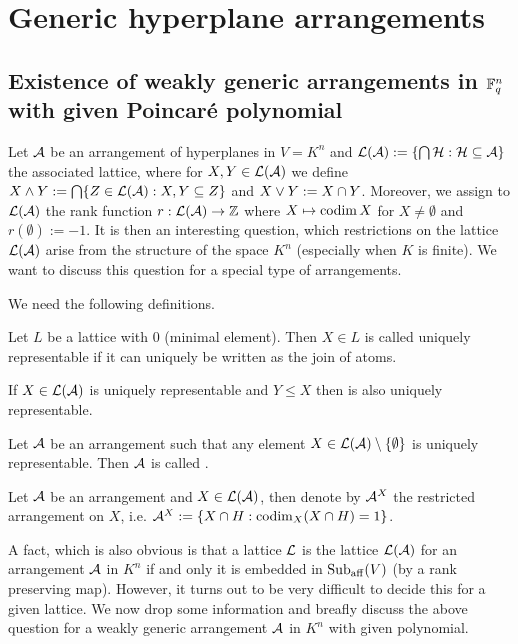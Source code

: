 \section{Generic hyperplane arrangements}

\subsection{Existence of weakly generic arrangements in $\mathbb{F}_{q}^n$ with given Poincaré polynomial}

Let $\mathcal{A}$ be an arrangement of hyperplanes in $V=K^n$ and $\mathcal{L}(\mathcal{A}):=\{\bigcap \mathcal{H}:\mathcal{H}\subseteq \mathcal{A}\}$ the associated lattice, where for $X,Y\in\mathcal{L}(\mathcal{A})$ we define $X\wedge Y:=\bigcap\{Z\in\mathcal{L}(\mathcal{A}):X,Y\subseteq Z\}$ and $X\vee Y:= X\cap Y$.
Moreover, we assign to $\mathcal{L}(\mathcal{A})$ the rank function $r:\mathcal{L}(\mathcal{A})\rightarrow \mathbb{Z}$ where $X\mapsto \mathop\mathrm{codim} X$ for $X\neq \emptyset$ and $r(\emptyset):=-1$.
It is then an interesting question, which restrictions on the lattice $\mathcal{L}(\mathcal{A})$ arise from the structure of the space $K^n$ (especially when $K$ is finite). We want to discuss this question for a special type of arrangements.

We need the following definitions.

\begin{definition} 
    Let $L$ be a lattice with $0$ (minimal element). Then $X\in L$ is called uniquely representable if it can uniquely be written as the join of atoms.
\end{definition}

\begin{remark}
    If $X\in\mathcal{L}(\mathcal{A})$ is uniquely representable and $Y\leq X$ then is also uniquely representable. 
\end{remark}

\begin{definition}
    Let $\mathcal{A}$ be an arrangement such that any element $X\in\mathcal{L}(\mathcal{A})\setminus\left\{\emptyset\right\}$ is uniquely representable. Then $\mathcal{A}$ is called .
\end{definition}

\begin{definition}
    Let $\mathcal{A}$ be an arrangement and $X\in\mathcal{L}(\mathcal{A})$, then denote by $\mathcal{A}^X$ the restricted arrangement on $X$, i.e. $\mathcal{A}^X:=\left\{X\cap H:\mathop\mathrm{codim}_X(X\cap H)=1\right\}$.
\end{definition}

A fact, which is also obvious is that a lattice $\mathcal{L}$ is the lattice $\mathcal{L}(\mathcal{A})$ for an arrangement $\mathcal{A}$ in $K^n$ if and only it is embedded in $\mathop\mathrm{Sub}_{\mathop\mathrm{aff}}(V)$ (by a rank preserving map). However, it turns out to be very difficult to decide this for a given lattice.
We now drop some information and breafly discuss the above question for a weakly generic arrangement $\mathcal{A}$ in $K^n$ with given  polynomial.

